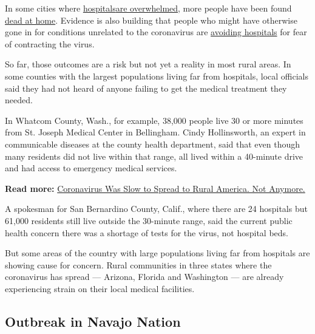 In some cities where
\href{https://www.nytimes3xbfgragh.onion/2020/03/25/nyregion/nyc-coronavirus-hospitals.html}{hospitals}\href{https://www.nytimes3xbfgragh.onion/2020/03/25/nyregion/nyc-coronavirus-hospitals.html}{are
overwhelmed}, more people have been found
\href{https://www.propublica.org/article/theres-been-a-spike-in-people-dying-at-home-in-several-cities-that-suggests-coronavirus-deaths-are-higher-than-reported}{dead
at home}. Evidence is also building that people who might have otherwise
gone in for conditions unrelated to the coronavirus are
\href{https://www.nytimes3xbfgragh.onion/2020/04/06/well/live/coronavirus-doctors-hospitals-emergency-care-heart-attack-stroke.html}{avoiding
hospitals} for fear of contracting the virus.

So far, those outcomes are a risk but not yet a reality in most rural
areas. In some counties with the largest populations living far from
hospitals, local officials said they had not heard of anyone failing to
get the medical treatment they needed.

In Whatcom County, Wash., for example, 38,000 people live 30 or more
minutes from St. Joseph Medical Center in Bellingham. Cindy
Hollinsworth, an expert in communicable diseases at the county health
department, said that even though many residents did not live within
that range, all lived within a 40-minute drive and had access to
emergency medical services.

\textbf{Read more:}
\href{https://www.nytimes3xbfgragh.onion/interactive/2020/04/08/us/coronavirus-rural-america-cases.html}{Coronavirus
Was Slow to Spread to Rural America. Not Anymore.}

A spokesman for San Bernardino County, Calif., where there are 24
hospitals but 61,000 residents still live outside the 30-minute range,
said the current public health concern there was a shortage of tests for
the virus, not hospital beds.

But some areas of the country with large populations living far from
hospitals are showing cause for concern. Rural communities in three
states where the coronavirus has spread --- Arizona, Florida and
Washington --- are already experiencing strain on their local medical
facilities.

\hypertarget{outbreak-in-navajo-nation}{%
\subsection{Outbreak in Navajo Nation}\label{outbreak-in-navajo-nation}}

